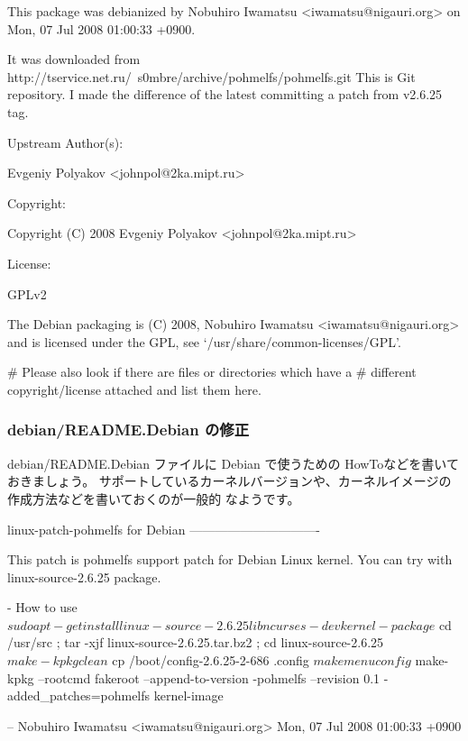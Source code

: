 \documentclass[mingoth,a4paper]{jsarticle}
\begin{document}
\begin{commandline}
This package was debianized by Nobuhiro Iwamatsu <iwamatsu@nigauri.org> on
Mon, 07 Jul 2008 01:00:33 +0900.

It was downloaded from
        http://tservice.net.ru/~s0mbre/archive/pohmelfs/pohmelfs.git
This is Git repository. I made the difference of the latest committing a
patch from v2.6.25 tag.

Upstream Author(s):

    Evgeniy Polyakov <johnpol@2ka.mipt.ru>

Copyright:

    Copyright (C) 2008 Evgeniy Polyakov <johnpol@2ka.mipt.ru>

License:

 GPLv2

The Debian packaging is (C) 2008, Nobuhiro Iwamatsu <iwamatsu@nigauri.org> and
is licensed under the GPL, see `/usr/share/common-licenses/GPL'.

# Please also look if there are files or directories which have a
# different copyright/license attached and list them here.

\end{commandline}

\subsubsection{debian/README.Debian の修正}
debian/README.Debian ファイルに Debian で使うための HowToなどを書いておきましょう。
サポートしているカーネルバージョンや、カーネルイメージの作成方法などを書いておくのが一般的
なようです。

\begin{commandline}
linux-patch-pohmelfs for Debian
-------------------------------

This patch is pohmelfs support patch for Debian Linux kernel. 
You can try with linux-source-2.6.25 package. 

- How to use
  $ sudo apt-get install linux-source-2.6.25 libncurses-dev kernel-package
  $ cd /usr/src ; tar -xjf linux-source-2.6.25.tar.bz2 ; cd linux-source-2.6.25
  $ make-kpkg clean
  $ cp /boot/config-2.6.25-2-686 .config
  $ make menuconfig
  $ make-kpkg --rootcmd fakeroot --append-to-version -pohmelfs --revision 0.1 -added_patches=pohmelfs kernel-image

 -- Nobuhiro Iwamatsu <iwamatsu@nigauri.org>  Mon, 07 Jul 2008 01:00:33 +0900

\end{commandline}
\end{document}

